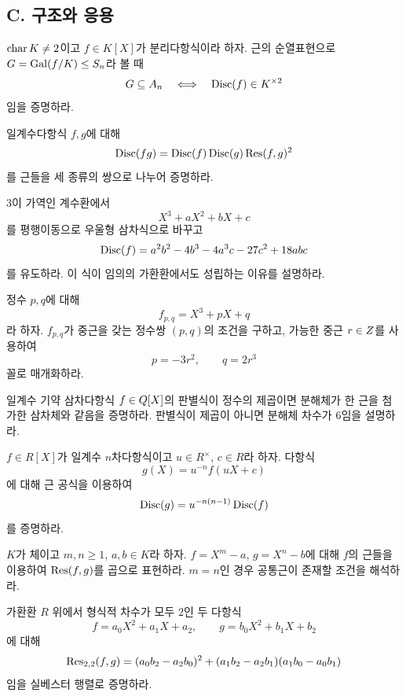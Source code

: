 \subsection*{C. 구조와 응용}

\begin{exercise}[*]
$\operatorname{char} K\ne2$이고 $f\in K[X]$가 분리다항식이라 하자. 근의 순열표현으로 $G=\operatorname{Gal}(f/K)\le S_n$라 볼 때
\[
  G\subseteq A_n
  \quad\Longleftrightarrow\quad
  \operatorname{Disc}(f)\in K^{\times2}
\]
임을 증명하라.
\end{exercise}

\begin{exercise}
일계수다항식 $f,g$에 대해
\[
  \operatorname{Disc}(fg)=\operatorname{Disc}(f)\operatorname{Disc}(g)\operatorname{Res}(f,g)^2
\]
를 근들을 세 종류의 쌍으로 나누어 증명하라.
\end{exercise}

\begin{exercise}[*]
$3$이 가역인 계수환에서
\[
  X^3+aX^2+bX+c
\]
를 평행이동으로 우울형 삼차식으로 바꾸고
\[
  \operatorname{Disc}(f)=a^2b^2-4b^3-4a^3c-27c^2+18abc
\]
를 유도하라. 이 식이 임의의 가환환에서도 성립하는 이유를 설명하라.
\end{exercise}

\begin{exercise}
정수 $p,q$에 대해
\[
  f_{p,q}=X^3+pX+q
\]
라 하자. $f_{p,q}$가 중근을 갖는 정수쌍 $(p,q)$의 조건을 구하고, 가능한 중근 $r\in Z$를 사용하여
\[
  p=-3r^2,
  \qquad q=2r^3
\]
꼴로 매개화하라.
\end{exercise}

\begin{exercise}
일계수 기약 삼차다항식 $f\in Q[X]$의 판별식이 정수의 제곱이면 분해체가 한 근을 첨가한 삼차체와 같음을 증명하라. 판별식이 제곱이 아니면 분해체 차수가 $6$임을 설명하라.
\end{exercise}

\begin{exercise}
$f\in R[X]$가 일계수 $n$차다항식이고 $u\in R^\times$, $c\in R$라 하자. 다항식
\[
  g(X)=u^{-n}f(uX+c)
\]
에 대해 근 공식을 이용하여
\[
  \operatorname{Disc}(g)=u^{-n(n-1)}\operatorname{Disc}(f)
\]
를 증명하라.
\end{exercise}

\begin{exercise}
$K$가 체이고 $m,n\ge1$, $a,b\in K$라 하자. $f=X^m-a$, $g=X^n-b$에 대해 $f$의 근들을 이용하여 $\operatorname{Res}(f,g)$를 곱으로 표현하라. $m=n$인 경우 공통근이 존재할 조건을 해석하라.
\end{exercise}

\begin{exercise}[*]
가환환 $R$ 위에서 형식적 차수가 모두 $2$인 두 다항식
\[
  f=a_0X^2+a_1X+a_2,
  \qquad
  g=b_0X^2+b_1X+b_2
\]
에 대해
\[
  \operatorname{Res}_{2,2}(f,g)
  =(a_0b_2-a_2b_0)^2
  +(a_1b_2-a_2b_1)(a_1b_0-a_0b_1)
\]
임을 실베스터 행렬로 증명하라.
\end{exercise}

